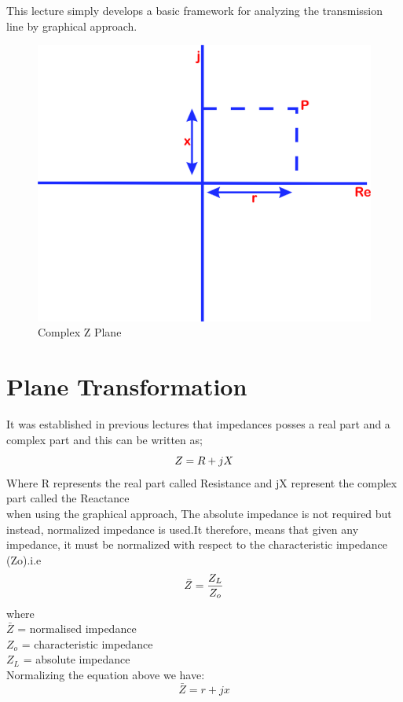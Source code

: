 This lecture simply develops a basic framework for analyzing the transmission line by graphical approach.
\begin{figure}[h]
\centering
\includegraphics[width=0.5\linewidth]{./graphics/mjhdj}
\caption{Complex Z Plane}
\label{fig:mjhdj}
\end{figure}
\section{Plane Transformation}
It was established in previous lectures that impedances posses a real part and a complex part and this can be written as;
\begin{equation*}
Z= R+jX\\
\end{equation*}
Where R  represents the real part called Resistance
and jX represent the complex part called the Reactance\\
when using the graphical approach, The absolute impedance is not required but instead, normalized impedance is used.It therefore, means that given any impedance, it must be normalized with respect to the characteristic impedance (Zo).i.e
\begin{equation*}
\bar{Z}=\frac{Z_L}{Z_o}\\
\end{equation*}
where\\
$\bar{Z}$ = normalised impedance\\
$Z_o$ = characteristic impedance\\
$Z_L$   =  absolute  impedance \\
Normalizing the equation above we have:\\    
\begin{equation*}
\bar{Z}= r + jx
\end{equation*}



